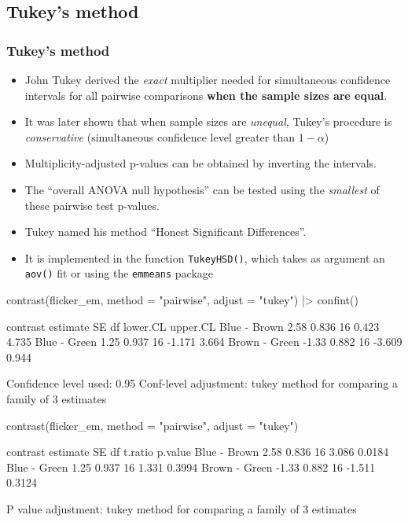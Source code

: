 \documentclass[a4paper]{article}\usepackage[]{graphicx}\usepackage[]{xcolor}
\begin{document}
\subsection{Tukey's method}
\subsubsection{Tukey's method}
\begin{itemize}
	\item John Tukey derived the \textit{exact} multiplier needed for simultaneous confidence intervals for all pairwise comparisons \textbf{when the sample sizes are equal}.
	\item It was later shown that when sample sizes are \textit{unequal}, Tukey's procedure is \textit{conservative} (simultaneous confidence level greater than \( 1-\alpha \))
	\item Multiplicity-adjusted p-values can be obtained by inverting the intervals.
	\item The ``overall ANOVA null hypothesis'' can be tested using the \textit{smallest} of these pairwise test p-values.
	\item Tukey named his method ``Honest Significant Differences''.
	\item It is implemented in the function \lstinline|TukeyHSD()|, which takes as argument an \lstinline|aov()| fit or using the \lstinline|emmeans| package
\end{itemize}
\begin{Schunk}
\begin{Sinput}
contrast(flicker_em, method = "pairwise", adjust = "tukey") |> confint()
\end{Sinput}
\begin{Soutput}
 contrast      estimate    SE df lower.CL upper.CL
 Blue - Brown      2.58 0.836 16    0.423    4.735
 Blue - Green      1.25 0.937 16   -1.171    3.664
 Brown - Green    -1.33 0.882 16   -3.609    0.944

Confidence level used: 0.95 
Conf-level adjustment: tukey method for comparing a family of 3 estimates 
\end{Soutput}
\begin{Sinput}
contrast(flicker_em, method = "pairwise", adjust = "tukey")
\end{Sinput}
\begin{Soutput}
 contrast      estimate    SE df t.ratio p.value
 Blue - Brown      2.58 0.836 16   3.086  0.0184
 Blue - Green      1.25 0.937 16   1.331  0.3994
 Brown - Green    -1.33 0.882 16  -1.511  0.3124

P value adjustment: tukey method for comparing a family of 3 estimates 
\end{Soutput}
\end{Schunk}
\end{document}
